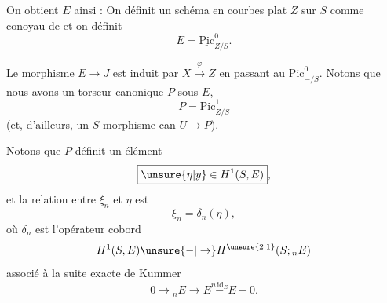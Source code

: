 On obtient $E$ ainsi :  On définit un schéma en courbes plat $Z$ sur $S$ comme conoyau de
et on définit
\[
E=\underline{\mathrm{Pic}}^{0}_{Z/S}.
\]

 Le morphisme $E\to J$ est induit par $X\xrightarrow{\varphi} Z$ en passant au $\underline{\mathrm{Pic}}^{0}_{-/S}$. Notons que nous avons un torseur canonique $P$ sous $E$,
\[
P=\underline{\mathrm{Pic}}^{1}_{Z/S}
\]
(et, d'ailleurs, un $S$-morphisme can $U\to P$).

Notons que $P$ définit un élément
\[
\boxed{\unsure{\eta|y}\in H^1(S,E)},
\]
et la relation entre $\xi_n$ et $\eta$ est
\[
\boxed{\xi_n=\delta_n(\eta)},
\]
où $\delta_n$ est l'opérateur cobord
\[
H^1(S,E)\unsure{-|\to}H^{\unsure{2|1}}(S;{}_{n}E)
\]
associé à la suite exacte de Kummer
\[
0\to{}_{n}E\to E\overset{n\,\mathrm{id}_E}{-}E-0.
\]

